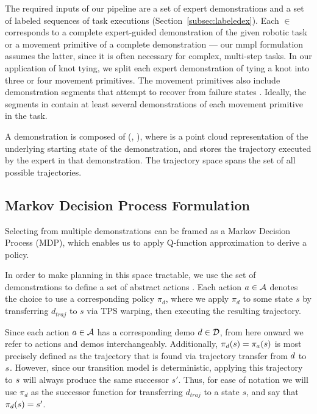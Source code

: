 The required inputs of our pipeline are a set \demoset{}
of expert demonstrations and a set  of labeled sequences of
task executions (Section~\ref{subsec:labeledex}).
Each \demovar{} $\in$ \demoset{} corresponds to a complete expert-guided
demonstration of the given robotic task or a movement primitive of a complete
demonstration --- our {\sc mmpl} formulation assumes the latter,
since it is often necessary for complex, multi-step tasks.
In our application of knot tying, we split each expert demonstration of
tying a knot into three or four movement primitives. The movement primitives
also include demonstration segments that attempt to
recover from failure states \cite{Schulmanetal_ISRR2013}.
Ideally, the segments in \demoset{} contain at least several demonstrations
of each movement primitive in the task.

A demonstration \demovar{} is composed of (, ),
where  is a point cloud representation of the underlying
starting state of the demonstration, and  stores
the trajectory executed by the expert in that demonstration. The trajectory
space \trajset{} spans the set of all possible trajectories.


\subsection{Markov Decision Process Formulation}
Selecting from multiple demonstrations can be framed as a Markov Decision
Process (MDP), which enables us to apply Q-function approximation to derive a
policy.

In order to make planning in this space tractable, we use the set of
demonstrations \demoset{} to define a set of abstract actions \actionset{}. Each
action $a \in \mathcal{A}$ denotes the choice to use a corresponding
policy $\pi_d$, where we apply $\pi_d$ to some state $s$ by transferring
$d_{traj}$ to $s$ via TPS warping, then executing the resulting trajectory.

Since each action $a \in \mathcal{A}$ has a corresponding demo $d
\in \mathcal{D}$, from here onward we refer to actions and demos
interchangeably. Additionally, $\pi_{d}(s) =
\pi_{a}(s)$ is most precisely defined as the trajectory that is
found via trajectory transfer from $d$ to $s$. However, since our
transition model is deterministic, applying this trajectory to $s$ will
always produce the same successor $s'$. Thus, for ease of notation we will use
$\pi_{d}$ as the successor function for transferring $d_{traj}$ to a state $s$,
and say that $\pi_{d}(s) = s'$.

